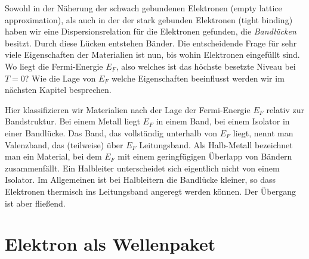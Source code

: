 Sowohl in der Näherung der schwach gebundenen Elektronen (empty lattice approximation), als auch in der der stark gebunden Elektronen (tight binding) haben wir eine Dispersionsrelation für die Elektronen gefunden, die \emph{Bandlücken} besitzt. Durch diese Lücken entstehen Bänder. Die entscheidende Frage für sehr viele Eigenschaften der Materialien ist nun, bis wohin Elektronen eingefüllt sind. Wo liegt die Fermi-Energie $E_F$, also welches ist das höchste besetzte Niveau bei $T=0$? Wie die Lage von $E_F$ welche Eigenschaften beeinflusst werden wir im nächsten Kapitel besprechen.

Hier klassifizieren wir Materialien nach der Lage der Fermi-Energie $E_F$ relativ zur Bandstruktur. Bei einem Metall liegt $E_F$ in einem Band, bei einem Isolator in einer Bandlücke. Das Band, das vollständig unterhalb von $E_F$ liegt, nennt man Valenzband, das (teilweise) über $E_F$ Leitungsband. Als Halb-Metall bezeichnet man ein Material, bei dem $E_F$ mit einem geringfügigen Überlapp von Bändern zusammenfällt. Ein Halbleiter unterscheidet sich eigentlich nicht von einem Isolator. Im Allgemeinen ist bei Halbleitern die Bandlücke kleiner, so dass Elektronen thermisch ins Leitungsband angeregt werden können. Der Übergang ist aber fließend.





\section{Elektron als Wellenpaket}

